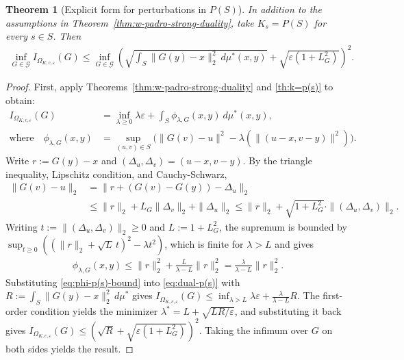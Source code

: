\documentclass{article}
\newcommand{\Okc}{\Omega_{K, c, \varepsilon}}
\newcommand{\phifix}{\phi_{\lambda, G}}
\newtheorem{theorem}{Theorem}[section]
\theoremstyle{definition}
\theoremstyle{remarksty}
\begin{document}
\begin{theorem}[Explicit form for perturbations in $P(S)$]\label{th:explicit-p(s)}
In addition to the assumptions in Theorem~\ref{thm:w-padro-strong-duality}, take $K_s=P(S)$ for every $s \in S$. Then
    \begin{align*}
        \inf_{G \in \mathcal{G}} I_{\Okc} (G) \leq \inf_{G \in \mathcal{G}} \left(\sqrt{\int_S \|G(y)-x\|^2_2\ d\mu^*(x,y)} + \sqrt{\varepsilon(1+L_G^2)} \right)^2.
    \end{align*}
\end{theorem}
\begin{proof}
First, apply Theorems~\ref{thm:w-padro-strong-duality} and \ref{th:k=p(s)} to obtain:
\begin{align}
    I_{\Okc} (G)&= \inf_{\lambda \geq 0} \lambda \varepsilon + \int_S \phifix (x,y)\ d\mu^*(x, y) \label{eq:dual-p(s)}, \\
    \text{where} \quad \phifix (x,y) &= \sup_{(u,v) \in S} \Big( \|G(v)-u\|^2 - \lambda(\|(u-x,v-y)\|^2)\Big).
\end{align}
Write $r:=G(y)-x$ and $(\Delta_u, \Delta_v)= (u-x,v-y)$. By the triangle inequality, Lipschitz condition, and Cauchy-Schwarz,
\begin{align*}
    \|G(v)-u\|_2 &= \|r+(G(v)-G(y))-\Delta_u\|_2  \\
    &\leq \|r\|_2 + L_G\|\Delta_v\|_2 + \|\Delta_u\|_2 \leq \|r\|_2 + \sqrt{1+L_G^2} \cdot \|(\Delta_u,\Delta_v)\|_2.
\end{align*}
Writing $t := \|(\Delta_u,\Delta_v)\|_2 \geq 0$ and $L := 1 + L_G^2$, the supremum is bounded by $\sup_{t \geq 0}((\|r\|_2 + \sqrt{L}\,t)^2 - \lambda t^2)$, which is finite for $\lambda > L$ and gives
\begin{align}\label{eq:phi-p(s)-bound}
    \phifix(x,y) \leq \|r\|_2^2 + \frac{L}{\lambda - L}\|r\|_2^2 = \frac{\lambda}{\lambda - L}\|r\|_2^2.
\end{align}
Substituting \eqref{eq:phi-p(s)-bound} into \eqref{eq:dual-p(s)} with $R := \int_S \|G(y)-x\|_2^2\, d\mu^*$ gives $I_{\Okc}(G) \leq \inf_{\lambda > L} \lambda\varepsilon + \frac{\lambda}{\lambda-L}R$. The first-order condition yields the minimizer $\lambda^* = L + \sqrt{LR/\varepsilon}$, and substituting it back gives $I_{\Okc}(G) \leq \left(\sqrt{R} + \sqrt{\varepsilon(1+L_G^2)}\right)^2$. Taking the infimum over $G$ on both sides yields the result.

\end{proof}
\end{document}
